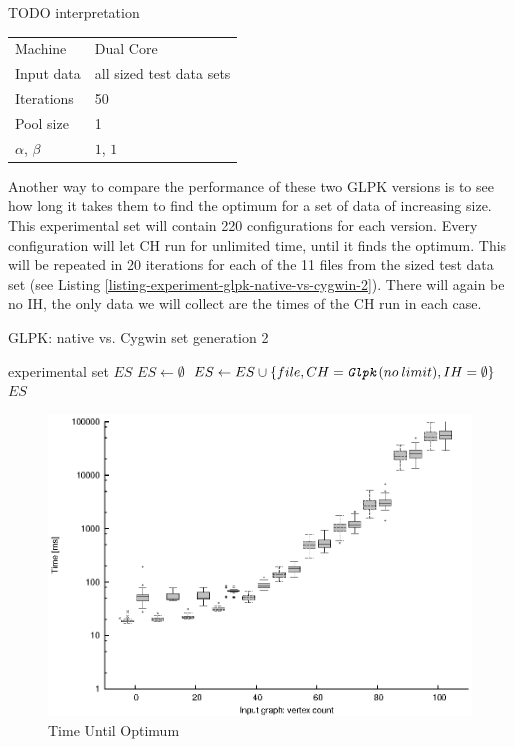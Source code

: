 TODO interpretation

\begin{center}
\bigskip
\begin{tabular}{| l | l |}
  \hline
  \hline
  Machine           & Dual Core \\
  Input data        & all sized test data sets \\
  Iterations        & 50 \\
  Pool size         & 1 \\
  $\alpha$, $\beta$ & $1$, $1$ \\
  \hline
\end{tabular}
\bigskip
\end{center}

Another way to compare the performance of these two GLPK versions is to see how long it takes them to find the optimum for a set of data of increasing size. This experimental set will contain 220 configurations for each version. Every configuration will let  CH run for unlimited time, until it finds the optimum. This will be repeated in 20 iterations for each of the 11 files from the sized test data set (see Listing \ref{listing-experiment-glpk-native-vs-cygwin-2}). There will again be no IH, the only data we will collect are the times of the CH run in each case.

\begin{algorithm}
\caption{GLPK: native vs. Cygwin set generation 2}
\label{listing-experiment-glpk-native-vs-cygwin-2}
\begin{algorithmic}
\ENSURE experimental set $ES$
\STATE $ES \gets \emptyset$
    \STATE $ES \gets ES \cup \{file, CH = \texttt{\textit{Glpk}}(no\:limit), IH = \emptyset\}$
  \ENDFOR
\ENDFOR
\RETURN $ES$
\end{algorithmic}
\end{algorithm}

\begin{figure}
  \caption{Time Until Optimum}
  \label{image-experiment-time-until-optimum}
  \centering
    \includegraphics[width=\textwidth]{images/experiments/time-till-optimum}
\end{figure}

